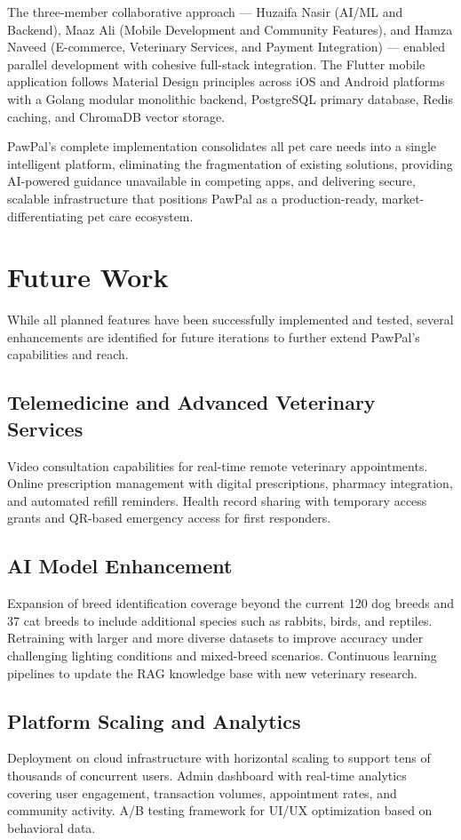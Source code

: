 The three-member collaborative approach --- Huzaifa Nasir (AI/ML and Backend), Maaz Ali (Mobile Development and Community Features), and Hamza Naveed (E-commerce, Veterinary Services, and Payment Integration) --- enabled parallel development with cohesive full-stack integration. The Flutter mobile application follows Material Design principles across iOS and Android platforms with a Golang modular monolithic backend, PostgreSQL primary database, Redis caching, and ChromaDB vector storage.

PawPal's complete implementation consolidates all pet care needs into a single intelligent platform, eliminating the fragmentation of existing solutions, providing AI-powered guidance unavailable in competing apps, and delivering secure, scalable infrastructure that positions PawPal as a production-ready, market-differentiating pet care ecosystem.

\section{Future Work}
While all planned features have been successfully implemented and tested, several enhancements are identified for future iterations to further extend PawPal's capabilities and reach.

\subsection{Telemedicine and Advanced Veterinary Services}
Video consultation capabilities for real-time remote veterinary appointments. Online prescription management with digital prescriptions, pharmacy integration, and automated refill reminders. Health record sharing with temporary access grants and QR-based emergency access for first responders.

\subsection{AI Model Enhancement}
Expansion of breed identification coverage beyond the current 120 dog breeds and 37 cat breeds to include additional species such as rabbits, birds, and reptiles. Retraining with larger and more diverse datasets to improve accuracy under challenging lighting conditions and mixed-breed scenarios. Continuous learning pipelines to update the RAG knowledge base with new veterinary research.

\subsection{Platform Scaling and Analytics}
Deployment on cloud infrastructure with horizontal scaling to support tens of thousands of concurrent users. Admin dashboard with real-time analytics covering user engagement, transaction volumes, appointment rates, and community activity. A/B testing framework for UI/UX optimization based on behavioral data.

